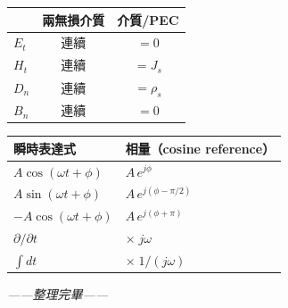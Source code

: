 \documentclass[12pt,a4paper]{article}
\begin{document}
\begin{keybox}[邊界條件速查]
\renewcommand{\arraystretch}{1.5}
\begin{center}
\begin{tabular}{lcc}
\toprule
& \textbf{兩無損介質} & \textbf{介質/PEC} \\
\midrule
$E_t$ & 連續 & $= 0$ \\
$H_t$ & 連續 & $= J_s$ \\
$D_n$ & 連續 & $= \rho_s$ \\
$B_n$ & 連續 & $= 0$ \\
\bottomrule
\end{tabular}
\end{center}
\end{keybox}

\begin{keybox}[相量轉換速查]
\renewcommand{\arraystretch}{1.8}
\begin{center}
\begin{tabular}{ll}
\toprule
\textbf{瞬時表達式} & \textbf{相量（cosine reference）} \\
\midrule
$A\cos(\omega t + \phi)$ & $A\,e^{j\phi}$ \\
$A\sin(\omega t + \phi)$ & $A\,e^{j(\phi-\pi/2)}$ \\
$-A\cos(\omega t + \phi)$ & $A\,e^{j(\phi+\pi)}$ \\
$\partial/\partial t$ & $\times\;j\omega$ \\
$\int dt$ & $\times\;1/(j\omega)$ \\
\bottomrule
\end{tabular}
\end{center}
\end{keybox}

\vfill
\begin{center}
\textit{——整理完畢——}
\end{center}
\end{document}
